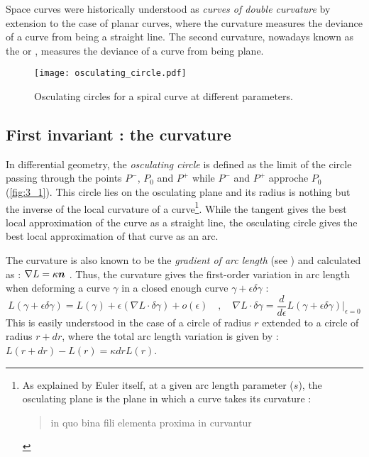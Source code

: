 Space curves were historically understood as \emph{curves of double curvature} by extension to the case of planar curves, where the curvature measures the deviance of a curve from being a straight line. The second curvature, nowadays known as the  or , measures the deviance of a curve from being plane. 


\begin{figure}[t]
	\centering
	\texttt{[image: osculating\_circle.pdf]}
	\caption{Osculating circles for a spiral curve at different parameters.}
	\label{fig:3_2}
\end{figure}

\subsection{First invariant : the curvature}\label{sec:curvature}
In differential geometry, the \emph{osculating circle} is defined as the limit of the circle passing through the points $P^-$, $P_0$ and $P^+$ while $P^-$ and $P^+$ approche $P_0$ (\cref{fig:3_1}). This circle lies on the osculating plane and its radius is nothing but the inverse of the local curvature of a curve\footnote{
As explained by Euler itself, at a given arc length parameter ($s$), the osculating plane is the plane in which a curve takes its curvature :  
\blockcquote[p.364]{Euler1775}{in quo bina fili elementa proxima in curvantur}.}. While the tangent gives the best local approximation of the curve as a straight line, the osculating circle gives the best local approximation of that curve as an arc.

The curvature is also known to be the \emph{gradient of arc length} (see \cite[p.4]{Vouga2014}) and calculated as : $\nabla{L} = \kappa \boldsymbol{n}$ . Thus, the curvature gives the first-order variation in arc length when deforming a curve $\gamma$ in a closed enough curve $\gamma + \epsilon \delta\gamma$ :
\begin{equation}
	L(\gamma + \epsilon \delta\gamma) = L(\gamma) + \epsilon (\nabla L \cdot \delta\gamma) + o(\epsilon)
	\quad , \quad
	\nabla L \cdot \delta\gamma
	= \frac{d}{d\epsilon}L(\gamma+\epsilon \delta \gamma)\Bigr|_{\epsilon = 0}
\end{equation}
This is easily understood in the case of a circle of radius $r$ extended to a circle of radius $r+dr$, where the total arc length variation is given by : 
$L(r + dr) - L(r) = \kappa dr L(r) $.

